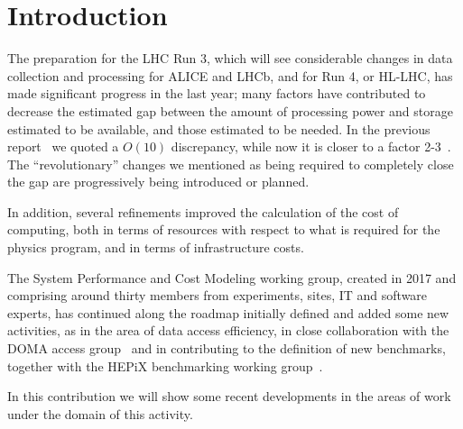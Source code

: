 \section{Introduction}
The preparation for the LHC Run 3, which will see considerable changes
in data collection and processing for ALICE and LHCb, and for Run 4,
or HL-LHC, has made significant progress in the last year; many
factors have contributed to decrease the estimated gap between the
amount of processing power and storage estimated to be available, and
those estimated to be needed.  In the previous report~\cite{costmodel}
we quoted a $O(10)$ discrepancy, while now it is closer to a factor
2-3~\cite{extrap}. The ``revolutionary'' changes we mentioned as
being required to completely close the gap are progressively being
introduced or planned.

In addition, several refinements improved the calculation of the cost
of computing, both in terms of resources with respect to what is
required for the physics program, and in terms of infrastructure
costs.

The System Performance and Cost Modeling working group, created in
2017 and comprising around thirty members from experiments, sites, IT
and software experts, has continued along the roadmap initially
defined and added some new activities, as in the area of data access
efficiency, in close collaboration with the DOMA access
group~\cite{domaaccess} and in contributing to the definition of new
benchmarks, together with the HEPiX benchmarking working
group~\cite{bench}.

In this contribution we will show some recent developments in the
areas of work under the domain of this activity.


